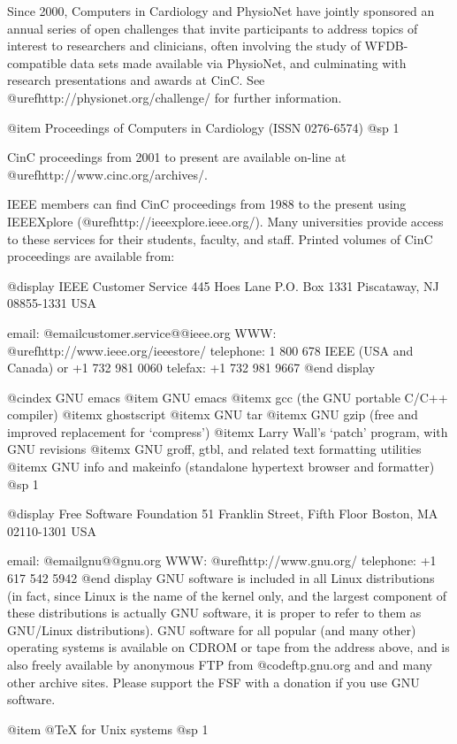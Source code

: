 {{{{{{{{Since 2000, Computers in Cardiology and PhysioNet have jointly sponsored
an annual series of open challenges that invite participants to address
topics of interest to researchers and clinicians, often involving the
study of WFDB-compatible data sets made available via PhysioNet, and
culminating with research presentations and awards at CinC.  See
@uref{http://physionet.org/challenge/} for further information.

@item Proceedings of Computers in Cardiology (ISSN 0276-6574)
@sp 1

CinC proceedings from 2001 to present are available on-line at
@uref{http://www.cinc.org/archives/}.

IEEE members can find CinC proceedings from 1988 to the
present using IEEEXplore (@uref{http://ieeexplore.ieee.org/}). Many
universities provide access to these services for their students, faculty, and
staff.  Printed volumes of CinC proceedings are available from:

@display
IEEE Customer Service
445 Hoes Lane
P.O. Box 1331
Piscataway, NJ 08855-1331 USA

email: @email{customer.service@@ieee.org}
WWW: @uref{http://www.ieee.org/ieeestore/}
telephone: 1 800 678 IEEE (USA and Canada) or +1 732 981 0060
telefax: +1 732 981 9667
@end display

@cindex GNU emacs
@item GNU emacs
@itemx gcc (the GNU portable C/C++ compiler)
@itemx ghostscript
@itemx GNU tar
@itemx GNU gzip (free and improved replacement for `compress')
@itemx Larry Wall's `patch' program, with GNU revisions
@itemx GNU groff, gtbl, and related text formatting utilities
@itemx GNU info and makeinfo (standalone hypertext browser and formatter)
@sp 1

@display
Free Software Foundation
51 Franklin Street, Fifth Floor
Boston, MA 02110-1301 USA

email: @email{gnu@@gnu.org}
WWW: @uref{http://www.gnu.org/}
telephone: +1 617 542 5942
@end display
GNU software is included in all Linux distributions (in fact, since Linux
is the name of the kernel only, and the largest component of these
distributions is actually GNU software, it is proper to refer to them as
GNU/Linux distributions).  GNU software for all popular (and many other)
operating systems is available on CDROM or tape from the address above, and
is also freely available by anonymous FTP from @code{ftp.gnu.org} and and many
other archive sites.  Please support the FSF with a donation if you use GNU
software.

@item @TeX{} for Unix systems
@sp 1

}}}}}}}}

